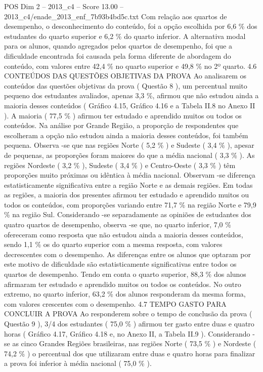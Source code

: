\begin{textsample}{POS Dim 2 – 2013\_c4 – Score 13.00 – 2013\_c4/enade\_2013\_enf\_7b93b4bd5c.txt}
Com relação aos quartos de desempenho, o desconhecimento do conteúdo, foi a opção escolhida por 6,6 \% dos estudantes do quarto superior e 6,2 \% do quarto inferior.
A alternativa modal para os alunos, quando agregados pelos quartos de desempenho, foi que a dificuldade encontrada foi causada pela forma diferente de abordagem do conteúdo, com valores entre 42,4 \% no quarto superior e 49,8 \% no 2º quarto. 4.6 CONTEÚDOS DAS QUESTÕES OBJETIVAS DA PROVA Ao analisarem os conteúdos das questões objetivas da prova ( Questão 8 ), um percentual muito pequeno dos estudantes avaliados, apenas 3,3 \%, afirmou que não estudou ainda a maioria desses conteúdos ( Gráfico 4.15, Gráfico 4.16 e a Tabela II.8 no Anexo II ).
A maioria ( 77,5 \% ) afirmou ter estudado e aprendido muitos ou todos os conteúdos.
Na análise por Grande Região, a proporção de respondentes que escolheram a opção não estudou ainda a maioria desses conteúdos, foi também pequena.
Observa -se que nas regiões Norte ( 5,2 \% ) e Sudeste ( 3,4 \% ), apesar de pequenas, as proporções foram maiores do que a média nacional ( 3,3 \% ).
As regiões Nordeste ( 3,2 \% ), Sudeste ( 3,4 \% ) e Centro-Oeste ( 3,3 \% ) têm proporções muito próximas ou idêntica à média nacional.
Observam -se diferença estatisticamente significativa entre a região Norte e as demais regiões.
Em todas as regiões, a maioria dos presentes afirmou ter estudado e aprendido muitos ou todos os conteúdos, com proporções variando entre 71,7 \% na região Norte e 79,9 \% na região Sul.
Considerando -se separadamente as opiniões de estudantes dos quatro quartos de desempenho, observa -se que, no quarto inferior, 7,0 \% ofereceram como resposta que não estudou ainda a maioria desses conteúdos, sendo 1,1 \% os do quarto superior com a mesma resposta, com valores decrescentes com o desempenho.
As diferenças entre os alunos que optaram por este motivo de dificuldade são estatisticamente significativas entre todos os quartos de desempenho.
Tendo em conta o quarto superior, 88,3 \% dos alunos afirmaram ter estudado e aprendido muitos ou todos os conteúdos.
No outro extremo, no quarto inferior, 63,2 \% dos alunos responderam da mesma forma, com valores crescentes com o desempenho. 4.7 TEMPO GASTO PARA CONCLUIR A PROVA Ao responderem sobre o tempo de conclusão da prova ( Questão 9 ), 3/4 dos estudantes ( 75,0 \% ) afirmou ter gasto entre duas e quatro horas ( Gráfico 4.17, Gráfico 4.18 e, no Anexo II, a Tabela II.9 ).
Considerando -se as cinco Grandes Regiões brasileiras, nas regiões Norte ( 73,5 \% ) e Nordeste ( 74,2 \% ) o percentual dos que utilizaram entre duas e quatro horas para finalizar a prova foi inferior à média nacional ( 75,0 \% ).

\end{textsample}
